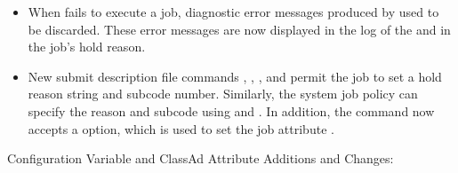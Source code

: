 \begin{itemize}
\item When  fails to execute a job,
diagnostic error messages produced by  used to be discarded.
These error messages are now displayed in the log of the  
and in the job's hold reason. 

\item New submit description file commands
, ,
, and 
permit the job to set a hold reason string and subcode number.
Similarly, the system job policy can specify the reason and subcode 
using  and 
.
In addition, the  command now accepts a  option,
which is used to set the job attribute . 

\end{itemize}


\noindent Configuration Variable and ClassAd Attribute Additions and Changes:

